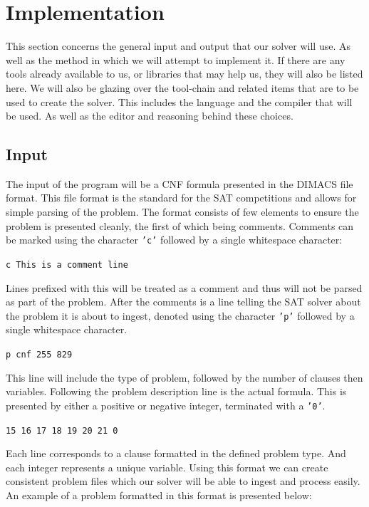 \documentclass{article}
\begin{document}
\section{Implementation}
This section concerns the general input and output that our solver will use. As well as the method in which we will attempt to
implement it. If there are any tools already available to us, or libraries that may help us, they will also be listed here. We
will also be glazing over the tool-chain and related items that are to be used to create the solver. This includes the language
and the compiler that will be used. As well as the editor and reasoning behind these choices.

\subsection{Input}
The input of the program will be a CNF formula presented in the DIMACS file format. This file format
is the standard for the SAT competitions and allows for simple parsing of the problem. The format
consists of few elements to ensure the problem is presented cleanly, the first of which being
comments. Comments can be marked using the character \texttt{'c'} followed by a single whitespace
character:

\begin{center}
    \texttt{c This is a comment line}
\end{center}

Lines prefixed with this will be treated as a
comment and thus will not be parsed as part of the problem. After the comments is a line telling the
SAT solver about the problem it is about to ingest, denoted using the character \texttt{'p'}
followed by a single whitespace character.

\begin{center}
    \texttt{p cnf 255 829}
\end{center}

This line will include the type of problem, followed by the number of clauses then
variables. Following the problem description line is the actual formula. This is presented by either
a positive or negative integer, terminated with a \texttt{'0'}.

\begin{center}
    \texttt{15 16 17 18 19 20 21 0}
\end{center}

Each line corresponds to a clause formatted in the defined problem type. And each integer represents
a unique variable. Using this format we can create consistent problem files which our solver will be
able to ingest and process easily. An example of a problem formatted in this format is presented
below:
\end{document}
